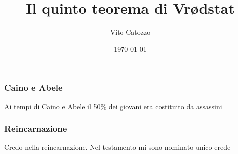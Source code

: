 \documentclass[12pt]{beamer}
\title{Il quinto teorema di Vr\o dstat} %
\author{Vito Catozzo}
\date{\today}
\begin{document}
\begin{frame}
  \maketitle %
\end{frame}

\begin{frame}
  \frametitle{Caino e Abele}
	Ai tempi di Caino e Abele il 50\% dei giovani era costituito da assassini
\end{frame}
\begin{frame}
  \frametitle{Reincarnazione}
	Credo nella reincarnazione. Nel testamento mi sono nominato unico erede
\end{frame}
\end{document}
